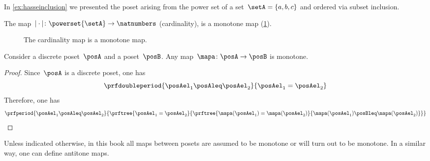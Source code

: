 \begin{example}
	In \cref{ex:hasseinclusion} we presented the poset arising from the power set of a set~$\setA=\{a,b,c\}$ and ordered via subset inclusion.

	The map~$\vert \cdot \vert \colon \powerset{\setA} \to \natnumbers$ (cardinality), is a monotone map (\cref{fig:cardinality}).
	\begin{figure}[h!]
		\centering
		\caption{The cardinality map is a monotone map. }
		\label{fig:cardinality}
	\end{figure}
\end{example}

\begin{lemma}
	Consider a discrete poset~$\posA$ and a poset~$\posB$.
	Any map~$\mapa \colon \posA\to \posB$ is monotone.
\end{lemma}
\begin{proof}
	Since~$\posA$ is a discrete poset, one has
	\begin{equation}
		\prfdoubleperiod{\posAel_1\posAleq \posAel_2}{\posAel_1=\posAel_2}
	\end{equation}
	Therefore, one has
	\begin{equation}
		\prfperiod{
			\posAel_1\posAleq \posAel_2
		}{
			\prftree{
				\posAel_1=\posAel_2
			}{
				\prftree{
					\mapa(\posAel_1)=\mapa(\posAel_2)
				}{
					\mapa(\posAel_1)\posBleq \mapa(\posAel_2)
				}
			}
		}
	\end{equation}
\end{proof}
Unless indicated otherwise, in this book all maps between posets are assumed to be monotone or will turn out to be monotone.
In a similar way, one can define antitone maps.

